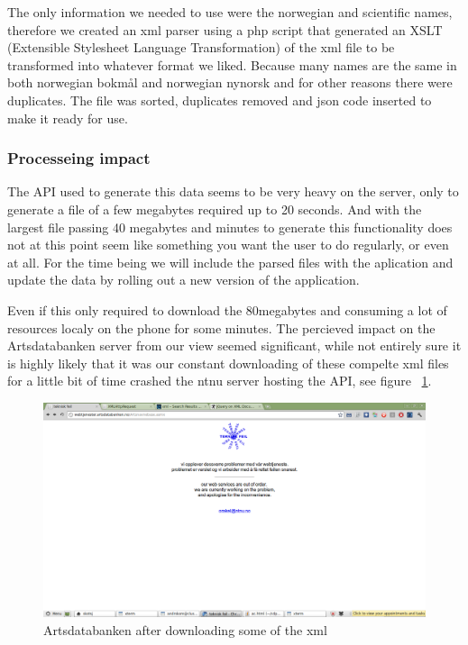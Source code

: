 	The only information we needed to use were the norwegian and scientific names, therefore we created an xml parser using a php script that generated an XSLT (Extensible Stylesheet Language Transformation\cite{w3:xslt}) of the xml file to be transformed into whatever format we liked.
	Because many names are the same in both norwegian bokmål and norwegian nynorsk and for other reasons there were duplicates.
	The file was sorted, duplicates removed and json code inserted to make it ready for use.

	\subsubsection{Processeing impact}
	The API used to generate this data seems to be very heavy on the server, only to generate a file of a few megabytes required up to 20 seconds. 
	And with the largest file passing 40 megabytes and minutes to generate this functionality does not at this point seem like something you want the user to do regularly, or even at all. 
	For the time being we will include the parsed files with the aplication and update the data by rolling out a new version of the application.

	Even if this only required to download the 80megabytes and consuming a lot of resources localy on the phone for some minutes. 
	The percieved impact on the Artsdatabanken server from our view seemed significant, while not entirely sure it is highly likely that it was our constant downloading of these compelte xml files for a little bit of time crashed the ntnu server hosting the API, see figure ~\ref{fig:artsdatabanken_api}.

	\begin{figure}[htb]
	\centering
	\includegraphics[width=1\textwidth]{implementation/preparation/ntnu_server_artsdatabanken.png}
	\caption{Artsdatabanken after downloading some of the xml}
	\label{fig:artsdatabanken_api}
	\end{figure}

